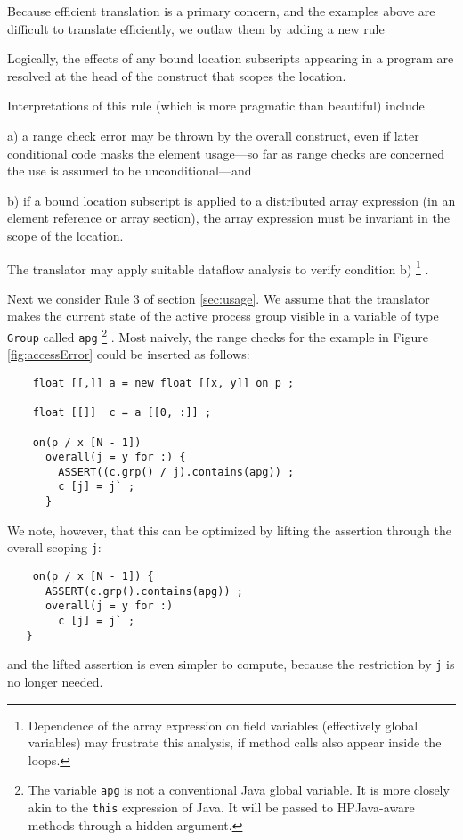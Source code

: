 \documentclass{article}
\begin{document}
Because efficient translation is a primary concern, and the
examples above are difficult to translate efficiently, we outlaw them
by adding a new rule
\begin{usageRule}
Logically, the effects of any bound location subscripts appearing in
a program are resolved at the head of the construct that scopes the
location.
\end{usageRule}
Interpretations of this rule (which is more pragmatic than
beautiful) include
\begin{description}
\item{a)}
a range check error may be thrown by the overall construct, even if
later conditional code masks the element usage---so far as range
checks are concerned the use is assumed to be unconditional---and
\item{b)}
if a bound location subscript is applied to a distributed array
expression (in an element reference or array section), the array
expression must be invariant in the scope of the location.
\end{description}
The translator may apply suitable dataflow analysis to verify condition
b)%
\footnote{Dependence of the array expression on field variables
(effectively global variables) may frustrate this analysis, if method
calls also appear inside the loops.}%
.

Next we consider Rule 3 of section \ref{sec:usage}.
We assume that the translator makes the current state of the
active process group visible in a variable of type {\tt Group}
called {\tt apg}%
\footnote{The variable {\tt apg} is not a conventional Java global
variable.  It is more closely akin to the {\tt this} expression of
Java.  It will be passed to HPJava-aware methods through a hidden
argument.}%
.  Most naively, the range checks for the example in Figure
\ref{fig:accessError} could be inserted as follows:
\small
\begin{verbatim}
    float [[,]] a = new float [[x, y]] on p ;

    float [[]]  c = a [[0, :]] ;

    on(p / x [N - 1])
      overall(j = y for :) {
        ASSERT((c.grp() / j).contains(apg)) ;
        c [j] = j` ;
      }
\end{verbatim}
\normalsize
We note, however, that this can be optimized by lifting the assertion
through the overall scoping {\tt j}:
\small
\begin{verbatim}
    on(p / x [N - 1]) {
      ASSERT(c.grp().contains(apg)) ;
      overall(j = y for :)
        c [j] = j` ;
   }
\end{verbatim}
\normalsize
and the lifted assertion is even simpler to compute, because the
restriction by {\tt j} is no longer needed.
\end{document}
